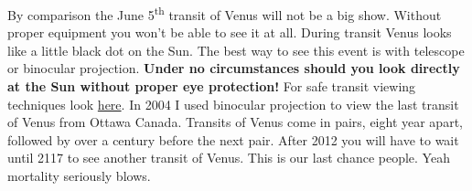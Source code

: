 By comparison the June 5\textsuperscript{th} transit of Venus will not
be a big show. Without proper equipment you won't be able to see it at
all. During transit Venus looks like a little black dot on the Sun. The
best way to see this event is with telescope or binocular projection.
\textbf{Under no circumstances should you look directly at the Sun
without proper eye protection!} For safe transit viewing techniques look
\href{http://www.mreclipse.com/Totality/TotalityCh11.html}{here}. In
2004 I used binocular projection to view the last transit of Venus from
Ottawa Canada. Transits of Venus come in pairs, eight year apart,
followed by over a century before the next pair. After 2012 you will
have to wait until 2117 to see another transit of Venus. This is our
last chance people. Yeah mortality seriously blows.







%